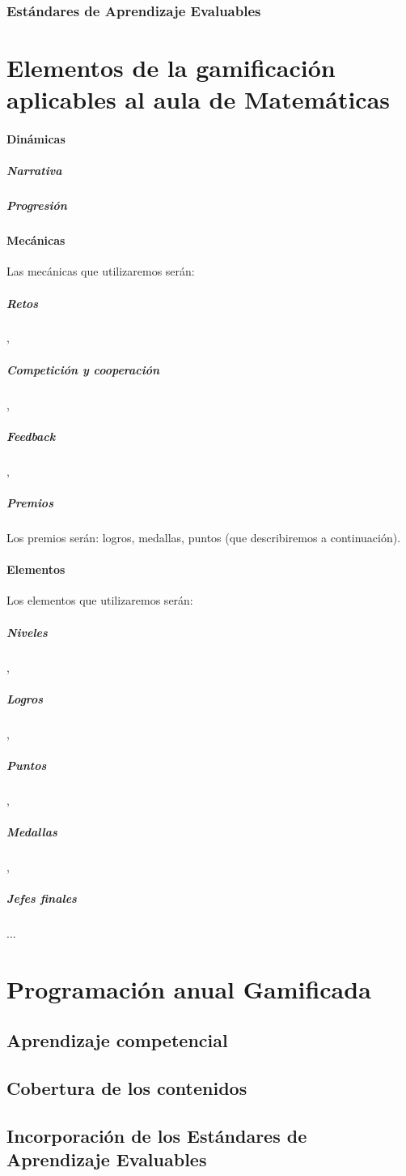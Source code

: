 \documentclass[a4paper, 12pt]{book}
\begin{document}
\subsubsection{Estándares de Aprendizaje Evaluables}


\section{Elementos de la gamificación aplicables al aula de Matemáticas}

\paragraph{Dinámicas}

\subparagraph{Narrativa}
\subparagraph{Progresión}

\paragraph{Mecánicas}

Las mecánicas que utilizaremos serán:
\subparagraph{Retos},
\subparagraph{Competición y cooperación},
\subparagraph{Feedback},
\subparagraph{Premios}

 Los premios serán: logros, medallas, puntos (que describiremos a continuación).

\paragraph{Elementos}

Los elementos que utilizaremos serán:
\subparagraph{Niveles},
\subparagraph{Logros},
\subparagraph{Puntos},
\subparagraph{Medallas},
\subparagraph{Jefes finales}...

\section{Programación anual Gamificada}

\subsection{Aprendizaje competencial}
\subsection{Cobertura de los contenidos}
\subsection{Incorporación de los Estándares de Aprendizaje Evaluables}
\end{document}
